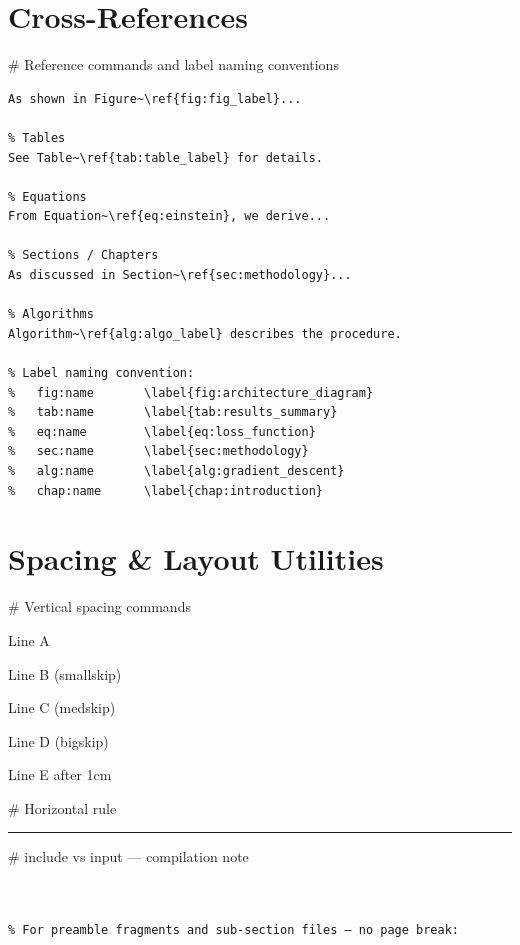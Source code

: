 \documentclass[12pt, a4paper]{article}
\newcommand{\snippetlabel}[1]{%
    \vspace{0.5em}%
    {\small\ttfamily\color{gray} \# #1}%
    \vspace{0.2em}%
}
\begin{document}
\section{Cross-References}

\snippetlabel{Reference commands and label naming conventions}

\begin{lstlisting}[language={[LaTeX]TeX}, basicstyle=\ttfamily\small,
                   frame=single, backgroundcolor=\color{gray!5}]
% Figures
As shown in Figure~\ref{fig:fig_label}...

% Tables
See Table~\ref{tab:table_label} for details.

% Equations
From Equation~\ref{eq:einstein}, we derive...

% Sections / Chapters
As discussed in Section~\ref{sec:methodology}...

% Algorithms
Algorithm~\ref{alg:algo_label} describes the procedure.

% Label naming convention:
%   fig:name       \label{fig:architecture_diagram}
%   tab:name       \label{tab:results_summary}
%   eq:name        \label{eq:loss_function}
%   sec:name       \label{sec:methodology}
%   alg:name       \label{alg:gradient_descent}
%   chap:name      \label{chap:introduction}
\end{lstlisting}

\section{Spacing \& Layout Utilities}

\snippetlabel{Vertical spacing commands}

\begin{LTXexample}[pos=r, width=0.4]
Line A
\smallskip

Line B (smallskip)
\medskip

Line C (medskip)
\bigskip

Line D (bigskip)

Line E \vspace{1cm} after 1cm
\end{LTXexample}

\snippetlabel{Horizontal rule}

\begin{LTXexample}[pos=r, width=0.4]
\rule{\linewidth}{1pt}
\end{LTXexample}

\snippetlabel{include vs input — compilation note}

\begin{lstlisting}[language={[LaTeX]TeX}, basicstyle=\ttfamily\small,
                   frame=single, backgroundcolor=\color{gray!5}]
% For chapters — always starts a new page, supports :


% For preamble fragments and sub-section files — no page break:

\end{lstlisting}
\end{document}
